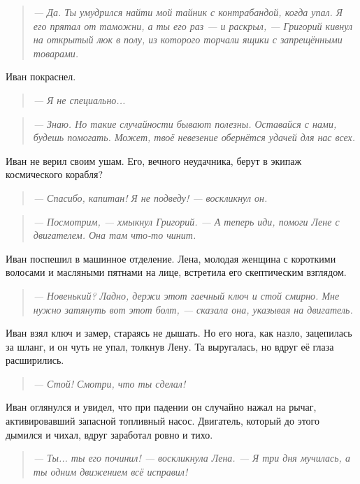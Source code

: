 \documentclass[12pt,a4paper]{book}
\newenvironment{dialogue}{\begin{quote}\itshape}{\end{quote}}
\begin{document}
\begin{dialogue}
--- Да. Ты умудрился найти мой тайник с контрабандой, когда упал. Я его прятал от таможни, а ты его раз --- и раскрыл, --- Григорий кивнул на открытый люк в полу, из которого торчали ящики с запрещёнными товарами.
\end{dialogue}

Иван покраснел.

\begin{dialogue}
--- Я не специально...
\end{dialogue}

\begin{dialogue}
--- Знаю. Но такие случайности бывают полезны. Оставайся с нами, будешь помогать. Может, твоё невезение обернётся удачей для нас всех.
\end{dialogue}

Иван не верил своим ушам. Его, вечного неудачника, берут в экипаж космического корабля?

\begin{dialogue}
--- Спасибо, капитан! Я не подведу! --- воскликнул он.
\end{dialogue}

\begin{dialogue}
--- Посмотрим, --- хмыкнул Григорий. --- А теперь иди, помоги Лене с двигателем. Она там что-то чинит.
\end{dialogue}

Иван поспешил в машинное отделение. Лена, молодая женщина с короткими волосами и масляными пятнами на лице, встретила его скептическим взглядом.

\begin{dialogue}
--- Новенький? Ладно, держи этот гаечный ключ и стой смирно. Мне нужно затянуть вот этот болт, --- сказала она, указывая на двигатель.
\end{dialogue}

Иван взял ключ и замер, стараясь не дышать. Но его нога, как назло, зацепилась за шланг, и он чуть не упал, толкнув Лену. Та выругалась, но вдруг её глаза расширились.

\begin{dialogue}
--- Стой! Смотри, что ты сделал!
\end{dialogue}

Иван оглянулся и увидел, что при падении он случайно нажал на рычаг, активировавший запасной топливный насос. Двигатель, который до этого дымился и чихал, вдруг заработал ровно и тихо.

\begin{dialogue}
--- Ты... ты его починил! --- воскликнула Лена. --- Я три дня мучилась, а ты одним движением всё исправил!
\end{dialogue}
\end{document}

